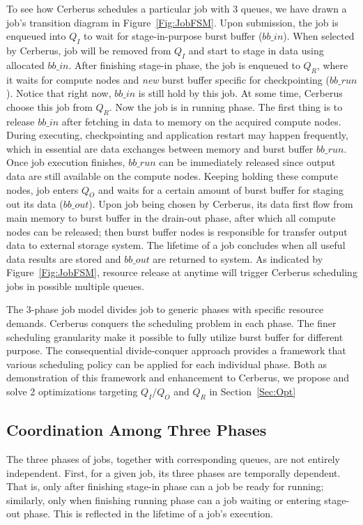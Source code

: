 To see how Cerberus schedules a particular job with 3 queues,
we have drawn a job's transition diagram in Figure~\ref{Fig:JobFSM}.
Upon submission, the job is enqueued into $Q_I$ to wait for stage-in-purpose burst buffer ($bb\_in$).
When selected by Cerberus, job will be removed from $Q_I$ and
start to stage in data using allocated $bb\_in$.
After finishing stage-in phase, the job is enqueued to $Q_R$, where it waits for
compute nodes and \textit{new} burst buffer specific for checkpointing ($bb\_run$).
Notice that right now, $bb\_in$ is still hold by this job.
At some time, Cerberus choose this job from $Q_R$.
Now the job is in running phase.
The first thing is to release $bb\_in$ after fetching in data to memory on the acquired compute nodes.
During executing, checkpointing and application restart may happen frequently, which in essential
are data exchanges between memory and burst buffer $bb\_run$.
Once job execution finishes, $bb\_run$ can be immediately released since
output data are still available on the compute nodes.
Keeping holding these compute nodes, job enters $Q_O$ and waits for a certain amount of burst
buffer for staging out its data ($bb\_out$).
Upon job being chosen by Cerberus, its data first flow from main memory to burst buffer
in the drain-out phase, after which all compute nodes can be released;
then burst buffer nodes is responsible for transfer output data to external storage system.
The lifetime of a job concludes when all useful data results are stored
and $bb\_out$ are returned to system.
As indicated by Figure~\ref{Fig:JobFSM}, resource release at anytime will trigger Cerberus
scheduling jobs in possible multiple queues.

The 3-phase job model divides job to generic phases with specific resource demands.
Cerberus conquers the scheduling problem in each phase.
The finer scheduling granularity make it possible to fully utilize burst buffer for different purpose.
The consequential divide-conquer approach provides a framework that various scheduling
policy can be applied for each individual phase.
Both as demonstration of this framework and enhancement to Cerberus,
we propose and solve 2 optimizations targeting $Q_I/Q_O$ and $Q_R$ in Section~\ref{Sec:Opt}

\subsection{Coordination Among Three Phases}
The three phases of jobs, together with corresponding queues, are not entirely independent.
First, for a given job, its three phases are temporally dependent.
That is, only after finishing stage-in phase can a job be ready for running;
similarly, only when finishing running phase can a job waiting or entering stage-out phase.
This is reflected in the lifetime of a job's execution.

